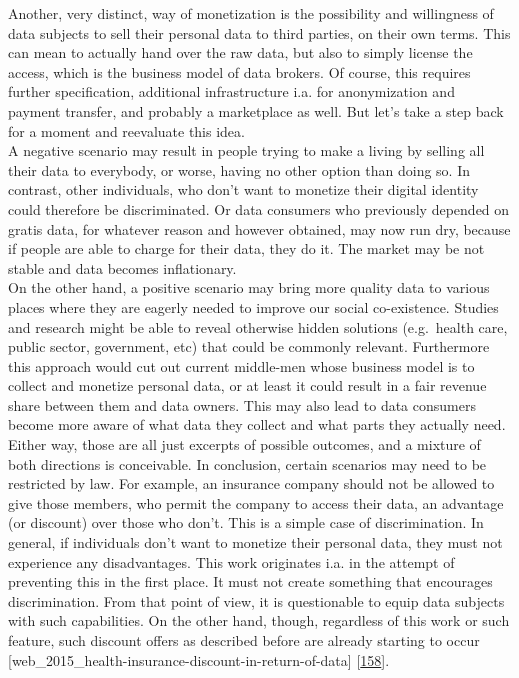 \documentclass[12pt,english,a4paper,titlepage,cleardoublepage=empty,dottedtoc]{report}
\begin{document}
Another, very distinct, way of monetization is the possibility and
willingness of data subjects to sell their personal data to third
parties, on their own terms. This can mean to actually hand over the raw
data, but also to simply license the access, which is the business model
of data brokers. Of course, this requires further specification,
additional infrastructure i.a. for anonymization and payment transfer,
and probably a marketplace as well. But let's take a step back for a
moment and reevaluate this idea.\\
A negative scenario may result in people trying to make a living by
selling all their data to everybody, or worse, having no other option
than doing so. In contrast, other individuals, who don't want to
monetize their digital identity could therefore be discriminated. Or
data consumers who previously depended on gratis data, for whatever
reason and however obtained, may now run dry, because if people are able
to charge for their data, they do it. The market may be not stable and
data becomes inflationary.\\
On the other hand, a positive scenario may bring more quality data to
various places where they are eagerly needed to improve our social
co-existence. Studies and research might be able to reveal otherwise
hidden solutions (e.g.~health care, public sector, government, etc) that
could be commonly relevant. Furthermore this approach would cut out
current middle-men whose business model is to collect and monetize
personal data, or at least it could result in a fair revenue share
between them and data owners. This may also lead to data consumers
become more aware of what data they collect and what parts they actually
need.\\
Either way, those are all just excerpts of possible outcomes, and a
mixture of both directions is conceivable. In conclusion, certain
scenarios may need to be restricted by law. For example, an insurance
company should not be allowed to give those members, who permit the
company to access their data, an advantage (or discount) over those who
don't. This is a simple case of discrimination. In general, if
individuals don't want to monetize their personal data, they must not
experience any disadvantages. This work originates i.a. in the attempt
of preventing this in the first place. It must not create something that
encourages discrimination. From that point of view, it is questionable
to equip data subjects with such capabilities. On the other hand,
though, regardless of this work or such feature, such discount offers as
described before are already starting to occur
{[}web\_2015\_health-insurance-discount-in-return-of-data{]}
{[}\protect\hyperlink{ref-web_2016_insurance-discount-in-return-of-data}{158}{]}.
\end{document}
